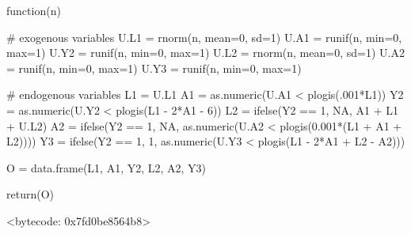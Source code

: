 \documentclass{exam}
\begin{document}
\begin{solution}
\begin{Schunk}
\end{Schunk}
\begin{Schunk}
\begin{Soutput}
function(n) {
  
  # exogenous variables
  U.L1 = rnorm(n, mean=0, sd=1)
  U.A1 = runif(n, min=0, max=1)
  U.Y2 = runif(n, min=0, max=1)
  U.L2 = rnorm(n, mean=0, sd=1)
  U.A2 = runif(n, min=0, max=1)
  U.Y3 = runif(n, min=0, max=1)
  
  # endogenous variables
  L1 = U.L1
  A1 = as.numeric(U.A1 < plogis(.001*L1))
  Y2 = as.numeric(U.Y2 < plogis(L1 - 2*A1 - 6))
  L2 = ifelse(Y2 == 1, NA, A1 + L1 + U.L2)
  A2 = ifelse(Y2 == 1, NA, as.numeric(U.A2 < plogis(0.001*(L1 + A1 + L2))))
  Y3 = ifelse(Y2 == 1, 1, as.numeric(U.Y3 < plogis(L1 - 2*A1 + L2 - A2)))
  
  O = data.frame(L1, A1, Y2, L2, A2, Y3)
  
  return(O)
  
}
<bytecode: 0x7fd0be8564b8>
\end{Soutput}
\end{Schunk}

\begin{Schunk}
\end{Schunk}


\end{solution}
\end{document}
